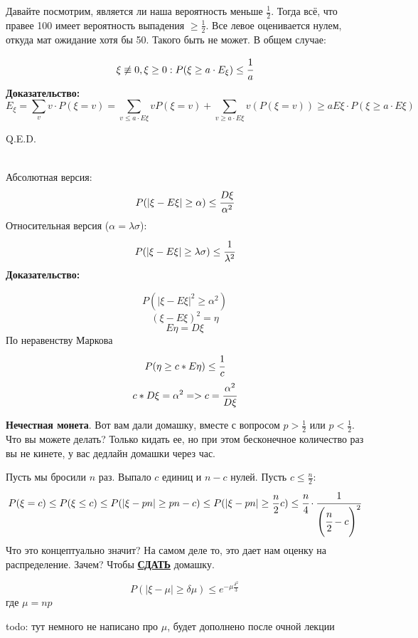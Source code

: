 Давайте посмотрим, является ли наша вероятность меньше $\frac 1 2$. Тогда всё, что правее 100 имеет вероятность выпадения $\geq \frac1 2 $. Все левое оценивается нулем, откуда мат ожидание хотя бы 50. Такого быть не может. В общем случае:

$$\xi\not \equiv0,\xi\geq 0: P(\xi\geq a \cdot E_{\xi}) \leq \cfrac{1}{a}$$
\textbf{Доказательство:}
$$E_{\xi} = \sum\limits_{v}v \cdot P(\xi = v) = \sum\limits_{v \le a \cdot E\xi} v P(\xi = v)+ \sum\limits_{v\geq a\cdot E\xi} v (P(\xi=v))\geq a E{\xi}\cdot P (\xi\geq a\cdot E{\xi})$$

\hfill Q.E.D.

 \\
Абсолютная версия:
$$P(|\xi-E\xi|\geq \alpha)\leq \cfrac{D\xi}{\alpha^2}$$
Относительная версия ($\alpha = \lambda\sigma$):
$$P(|\xi-E\xi|\geq \lambda\sigma)\leq \cfrac{1}{\lambda^2}$$
\textbf{Доказательство:}

$$P(|\xi-E\xi|^2\geq\alpha^2)$$
$$(\xi-E\xi)^2=\eta$$
$$E\eta=D\xi$$
По неравенству Маркова
$$P(\eta\geq c*E\eta)\leq \cfrac{1}{c}$$
$$c * D\xi=\alpha^2 => c=\cfrac{\alpha^2}{D\xi}$$

\textbf{Нечестная монета}. Вот вам дали домашку, вместе  с вопросом $p>\frac{1}{2}$ или $p<\frac{1}{2}$. Что вы можете делать? Только кидать ее, но при этом бесконечное количество раз вы не кинете, у вас дедлайн домашки через час. 

Пусть мы бросили $n$ раз. Выпало $c$ единиц и $n-c$ нулей. Пусть $c\le \frac{n}{2}$:
$$P(\xi = c)\leq P(\xi\leq c)\leq P(|\xi-pn|\geq pn-c)\leq  P(|\xi-pn|\geq \frac n 2 c)\leq \cfrac{n}{4}\cdot \cfrac{1}{\left(\cfrac{n}{2}-c\right)^2}$$
Что это концептуально значит? На самом деле то, это дает нам оценку на распределение. Зачем? Чтобы \textbf{\uline{СДАТЬ}} домашку.

$$P(|\xi-\mu |\geq \delta\mu)\leq e^{-\mu\frac{\delta^2}{3}}$$
где $\mu = np$  

todo: тут немного не написано про $\mu$, будет дополнено после очной лекции

